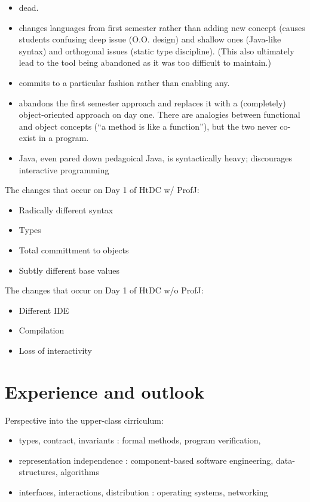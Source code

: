 \documentclass[submission,copyright]{eptcs}
\begin{document}
\begin{itemize}
\item dead.
\item changes languages from first semester rather than adding new
  concept (causes students confusing deep issue (O.O. design) and
  shallow ones (Java-like syntax) and orthogonal issues (static type
  discipline).  (This also ultimately lead to the tool being abandoned
  as it was too difficult to maintain.)

\item commits to a particular fashion rather than enabling any.

\item abandons the first semester approach and replaces it with a
  (completely) object-oriented approach on day one.  There are
  analogies between functional and object concepts (``a method is like
  a function''), but the two never co-exist in a program.

\item Java, even pared down pedagoical Java, is syntactically heavy; discourages
  interactive programming

\end{itemize}

The changes that occur on Day 1 of HtDC w/ ProfJ:

\begin{itemize}
\item Radically different syntax
\item Types
\item Total committment to objects
\item Subtly different base values
\end{itemize}

The changes that occur on Day 1 of HtDC w/o ProfJ:

\begin{itemize}
\item Different IDE
\item Compilation
\item Loss of interactivity
\end{itemize}

\section{Experience and outlook}

Perspective into the upper-class cirriculum:

\begin{itemize}
\item types, contract, invariants : formal methods, program verification,
  
\item representation independence : component-based software engineering,
  data-structures, algorithms

\item interfaces, interactions, distribution : operating systems, networking
\end{itemize}
\end{document}
